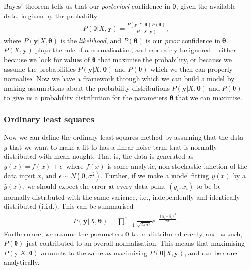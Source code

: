 \documentclass[twocolumn,english,notitlepage]{article}
\renewcommand{\vec}[1]{\boldsymbol{#1}}
\renewcommand{\exp}[1]{e^{#1}}
\begin{document}
        Bayes' theorem tells us that our \textit{posteriori} confidence in $\vec{\theta}$, given the available data, is given by the probabilty
        \begin{align}
            P(\vec{\theta}|X, \vec{y}) = \frac{P(\vec{y}|X,\vec{\vec{\theta}})P(\vec{\theta})}{P(X,\vec{y})},
        \end{align}
        where $P(\vec{y}|X, \vec{\theta})$ is the \textit{likelihood}, and $P(\vec{\theta})$ is our \textit{prior} confidence in $\vec{\theta}$. $P(X,\vec{y})$ plays the role of a normalisation, and can safely be ignored -- either because we look for values of $\vec{\theta}$ that maximise the probability, or because we assume the probabilities $P(\vec{y}|X,\vec{\theta})$ and $P(\vec{\theta})$ which we then can properly normalise. Now we have a framework through which we can build a model by making assumptions about the probability distributions $P(\vec{y}|X,\vec{\theta})$ and $P(\vec{\theta})$ to give us a probability distribution for the parameters $\vec{\theta}$ that we can maximise.


        \subsubsection{Ordinary least squares}
            Now we can define the ordinary least squares method by assuming that the data $y$ that we want to make a fit to has a linear noise term that is normally distributed with mean nought. That is, the data is generated as $y(x) = f(x) + \epsilon$, where $f(x)$ is some analytic, non-stochastic function of the data input $x$, and $\epsilon \sim N(0, \sigma^2)$. Further, if we make a model fitting $y(x)$ by a $\hat{y}(x)$, we should expect the error at every data point $(y_i, x_i)$ to be be normally distributed with the same variance, i.e., independently and identically distributed (i.i.d.). This can be summarised
            \begin{align}
                P(\vec{y}|X, \vec{\theta}) = \prod_{i=1}^{n} \frac{1}{\sqrt{2\pi\sigma^2}} \exp{-\frac{{(y_i-\hat{y}_i)}^2}{2\sigma^2}}.
            \end{align}
            Furthermore, we assume the parameters $\vec{\theta}$ to be distributed evenly, and as such, $P(\vec{\theta})$ just contributed to an overall normalisation. This means that maximising $P(\vec{y}|X, \vec{\theta})$ amounts to the same as maximising $P(\vec{\theta}|X, \vec{y})$, and can be done analytically.
\end{document}
